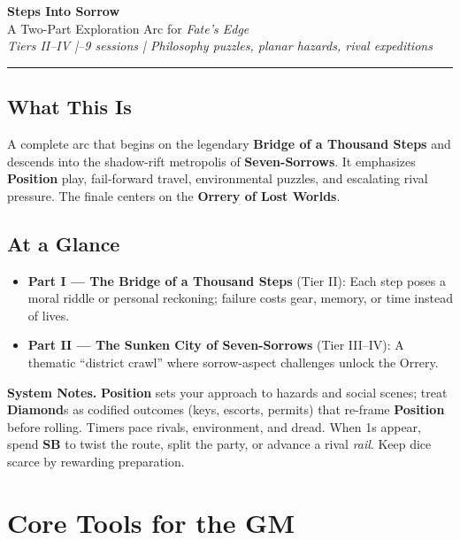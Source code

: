 \documentclass[11pt]{article}
\newcommand{\Term}[1]{\textbf{#1}}
\newcommand{\Position}{\Term{Position}}
\newcommand{\SB}{\Term{SB}}
\newcommand{\Diamond}{\Term{Diamond}}
\begin{document}


\begin{center}
{\LARGE \textbf{Steps Into Sorrow}}\\[4pt]
{\large A Two-Part Exploration Arc for \emph{Fate's Edge}}\\[2pt]
\textit{Tiers II--IV \;|--9 sessions \;|\; Philosophy puzzles, planar hazards, rival expeditions}
\end{center}

\hrule
\vspace{0.5em}

\subsection*{What This Is}
A complete arc that begins on the legendary \textbf{Bridge of a Thousand Steps} and descends into the shadow-rift metropolis of \textbf{Seven-Sorrows}. It emphasizes \Position{} play, fail-forward travel, environmental puzzles, and escalating rival pressure. The finale centers on the \textbf{Orrery of Lost Worlds}.

\subsection*{At a Glance}
\begin{itemize}
  \item \textbf{Part I --- The Bridge of a Thousand Steps} (Tier II): Each step poses a moral riddle or personal reckoning; failure costs gear, memory, or time instead of lives.
  \item \textbf{Part II --- The Sunken City of Seven-Sorrows} (Tier III--IV): A thematic ``district crawl'' where sorrow-aspect challenges unlock the Orrery.
\end{itemize}

\begin{tcolorbox}[breakable]
\textbf{System Notes.} \Position{} sets your approach to hazards and social scenes; treat \Diamond{}s as codified outcomes (keys, escorts, permits) that re-frame \Position{} before rolling. Timers pace rivals, environment, and dread. When 1s appear, spend \SB{} to twist the route, split the party, or advance a rival \emph{rail}. Keep dice scarce by rewarding preparation.
\end{tcolorbox}

\section*{Core Tools for the GM}
\end{document}
